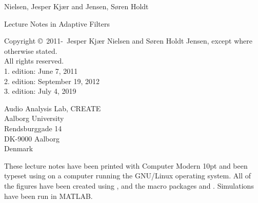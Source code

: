 \thispagestyle{empty}
{\small
\vspace*{\fill}
\noindent Nielsen, Jesper Kjær and Jensen, Søren Holdt

\noindent Lecture Notes in Adaptive Filters\\
\strut\vfill

\noindent Copyright \copyright\ 2011-\the\year\ Jesper Kjær Nielsen and Søren Holdt Jensen, except where otherwise stated. \\
All rights reserved.\\
1. edition: June 7, 2011\\
2. edition: September 19, 2012\\
3. edition: July 4, 2019\\

\strut\vfill
\noindent Audio Analysis Lab, CREATE\\
Aalborg University\\
Rendsburggade 14\\
DK-9000 Aalborg\\
Denmark\\

\strut\vfill

\strut\vfill %
\vspace{0.2cm}
\noindent These lecture notes have been printed with Computer Modern 10pt and been typeset using \LaTeXe{} on a computer running the GNU/Linux operating system. All of the figures have been created using \GNUPLOT{}, \PGF{} and the macro packages \TikZ{} and \PGFPLOTS{}. Simulations have been run in MATLAB\texttrademark.
}
\clearpage
